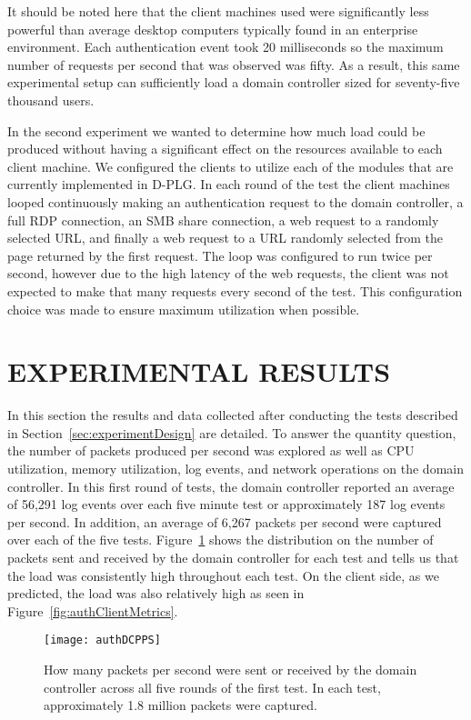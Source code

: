 It should be noted here that the client machines used were significantly less
powerful than average desktop computers typically found in an enterprise
environment.  Each authentication event took 20 milliseconds so the maximum
number of requests per second that was observed was fifty.  As a result, this
same experimental setup can sufficiently load a domain controller sized for
seventy-five thousand users.

In the second experiment we wanted to determine how much load could be produced
without having a significant effect on the resources available to each client
machine.  We configured the clients to utilize each of the modules that are
currently implemented in D-PLG.  In each round of the test the client machines
looped continuously making an authentication request to the domain controller,
a full RDP connection, an SMB share connection, a web request to a randomly
selected URL, and finally a web request to a URL randomly selected from the
page returned by the first request.  The loop was configured to run twice per
second, however due to the high latency of the web requests, the client was not
expected to make that many requests every second of the test.  This
configuration choice was made to ensure maximum utilization when possible.

\section{\uppercase{Experimental Results}} \label{sec:results}
\noindent In this section the results and data collected after conducting the
tests described in Section~\ref{sec:experimentDesign} are detailed.  To answer
the quantity question, the number of packets produced per second was explored
as well as CPU utilization, memory utilization, log events, and network
operations on the domain controller.  In this first round of tests, the domain
controller reported an average of 56,291 log events over each five minute test
or approximately 187 log events per second.  In addition, an average of 6,267
packets per second were captured over each of the five tests.
Figure~\ref{fig:authDCPPS} shows the distribution on the number of packets sent
and received by the domain controller for each test and tells us that the load
was consistently high throughout each test.  On the client side, as we
predicted, the load was also relatively high as seen in
Figure~\ref{fig:authClientMetrics}.

\begin{figure}[!ht] \centering
  \texttt{[image: authDCPPS]}
  \caption[Domain Controller Packets per Second]{How many packets per second
  were sent or received by the domain controller across all five rounds of the
  first test.  In each test, approximately 1.8 million packets were captured.}
  \label{fig:authDCPPS}
\end{figure}

